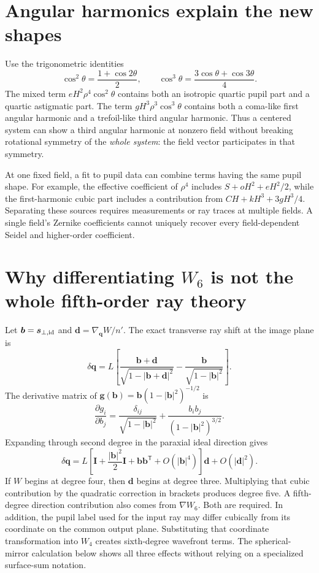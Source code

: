 \section{Angular harmonics explain the new shapes}
Use the trigonometric identities
\begin{equation}
 \cos^2\theta=\frac{1+\cos2\theta}{2},\qquad
 \cos^3\theta=\frac{3\cos\theta+\cos3\theta}{4}.
\end{equation}
The mixed term $eH^2\rho^4\cos^2\theta$ contains both an isotropic quartic
pupil part and a quartic astigmatic part. The term
$gH^3\rho^3\cos^3\theta$ contains both a coma-like first angular harmonic
and a trefoil-like third angular harmonic. Thus a centered system can show a
third angular harmonic at nonzero field without breaking rotational symmetry
of the \emph{whole system}: the field vector participates in that symmetry.

At one fixed field, a fit to pupil data can combine terms having the same
pupil shape. For example, the effective coefficient of $\rho^4$ includes
$S+oH^2+eH^2/2$, while the first-harmonic cubic part includes a contribution
from $C H+kH^3+3gH^3/4$. Separating these sources requires measurements or
ray traces at multiple fields. A single field's Zernike coefficients cannot
uniquely recover every field-dependent Seidel and higher-order coefficient.

\section{Why differentiating $W_6$ is not the whole fifth-order ray theory}
Let $\bm b=\bm s_{\perp,\rm id}$ and
$\bm d=\nabla_{\bm q}W/n'$. The exact transverse ray shift at the image plane is
\begin{equation}
 \delta\bm q=L\left[
    \frac{\bm b+\bm d}{\sqrt{1-|\bm b+\bm d|^2}}
   -\frac{\bm b}{\sqrt{1-|\bm b|^2}}\right].
 \label{ab:exactWray}
\end{equation}
The derivative matrix of $\bm g(\bm b)=\bm b(1-|\bm b|^2)^{-1/2}$ is
\begin{equation}
 \frac{\partial g_i}{\partial b_j}
 =\frac{\delta_{ij}}{\sqrt{1-|\bm b|^2}}
   +\frac{b_ib_j}{(1-|\bm b|^2)^{3/2}}.
\end{equation}
Expanding through second degree in the paraxial ideal direction gives
\begin{equation}
 \delta\bm q=L\left[
   \bm I+\frac{|\bm b|^2}{2}\bm I+\bm b\bm b^{\mathsf T}
   +O(|\bm b|^4)\right]\bm d+O(|\bm d|^2).
 \label{ab:transferjacobian}
\end{equation}
If $W$ begins at degree four, then $\bm d$ begins at degree three.
Multiplying that cubic contribution by the quadratic correction in brackets
produces degree five. A fifth-degree direction contribution also comes from
$\nabla W_6$. Both are required. In addition, the pupil label used for the
input ray may differ cubically from its coordinate on the common output
plane. Substituting that coordinate transformation into $W_4$ creates
sixth-degree wavefront terms. The spherical-mirror calculation below shows
all three effects without relying on a specialized surface-sum notation.


